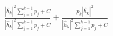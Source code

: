 \documentclass[preview]{standalone}
\begin{document}
\begin{align*}
\frac{\left|{\hat{h}_k}\right|^2\sum_{j=1}^{k-1}p_j+ C}{\left|{\hat{h}_k}\right|^2\sum_{j=1}^{k-1}p_j+ C} + \frac{p_k\left|{\hat{h}_k}\right|^2}{\left|{\hat{h}_k}\right|^2\sum_{j=1}^{k-1}p_j+ C}
\end{align*}
\end{document}
